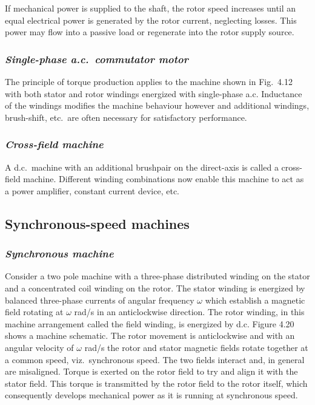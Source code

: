 \documentclass[a4paper,numbers=noenddot,12pt]{scrbook}
\begin{document}
If mechanical power is supplied to the shaft, the rotor speed increases until an equal electrical power is generated by the rotor current, neglecting losses. This power may flow into a passive load or regenerate into the rotor supply source. 

\subsubsection{\textit{Single-phase a.c.\ commutator motor}}
The principle of torque production applies to the machine shown in Fig.\ 4.12 with both stator and rotor windings energized with single-phase a.c. Inductance of the windings modifies the machine behaviour however and additional windings, brush-shift, etc.\ are often necessary for satisfactory performance. 

\subsubsection{\textit{Cross-field machine}}
A d.c.\ machine with an additional brush­pair on the direct-axis is called a cross-field machine. Different winding combinations now enable this machine to act as a power amplifier, constant current device, etc.

\subsection{Synchronous-speed machines}
\subsubsection{\textit{Synchronous machine}}
Consider a two pole machine with a three-phase distributed winding on the stator and a concentrated coil winding on the rotor. The stator winding is energized by balanced three-phase currents of angular frequency $\omega$ which establish a magnetic field rotating at $\omega$ rad/s in an anticlockwise direction. The rotor winding, in this machine arrangement called the field winding, is energized by d.c. Figure 4.20 shows a machine schematic. The rotor
movement is anticlockwise and with an angular velocity of $\omega$ rad/s the rotor and stator magnetic fields rotate together at a common speed, viz.\ synchronous speed. The two fields interact and, in general are misaligned. Torque is exerted on the rotor field to try and align it with the stator field. This torque is transmitted by the rotor field to the rotor itself, which consequently develops mechanical power as it is running at synchronous speed.
\end{document}
